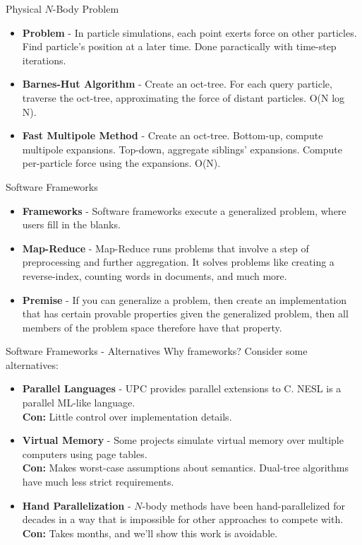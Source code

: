 \documentclass[pdf,colorBG,slideColor]{prosper}
\newcommand{\itemt}[1]{\item {\bf #1} -}
\begin{document}
\begin{slide}{Physical $N$-Body Problem}
  \begin{itemize}
    \itemt{Problem}
    In particle simulations, each point exerts force on other particles.
    Find particle's position at a later time.
    Done paractically with time-step iterations.
    \itemt{Barnes-Hut Algorithm}
    Create an oct-tree.
    For each query particle, traverse the oct-tree, approximating the force
    of distant particles. O(N log N).
    \itemt{Fast Multipole Method}
    Create an oct-tree.
    Bottom-up, compute multipole expansions.
    Top-down, aggregate siblings' expansions.
    Compute per-particle force using the expansions.
    O(N).
  \end{itemize}
\end{slide}

\begin{slide}{Software Frameworks}
  \begin{itemize}
    \itemt{Frameworks}
    Software frameworks execute a generalized problem, where
    users fill in the blanks.
    \itemt{Map-Reduce}
    Map-Reduce runs problems that involve a step of preprocessing and
    further aggregation.
    It solves problems like creating a reverse-index, counting words
    in documents, and much more.
    \itemt{Premise}
    If you can generalize a problem, then create an implementation that
    has certain provable properties given the generalized problem, then
    all members of the problem space therefore have that property.
  \end{itemize}
\end{slide}

\begin{slide}{Software Frameworks - Alternatives}
  Why frameworks?  Consider some alternatives:
  \begin{itemize}
    \itemt{Parallel Languages}
    UPC provides parallel extensions to C.  NESL is a parallel ML-like
    language.
    \\ {\bf Con:} Little control over implementation details.
    \itemt{Virtual Memory}
    Some projects simulate virtual memory over multiple computers
    using page tables.
    \\ {\bf Con:} Makes worst-case assumptions about semantics.
    Dual-tree algorithms have much less strict requirements.
    \itemt{Hand Parallelization}
    $N$-body methods have been hand-parallelized for decades in a way that
    is impossible for other approaches to compete with.
    \\ {\bf Con:} Takes months, and we'll show this work is avoidable.
  \end{itemize}
\end{slide}
\end{document}
